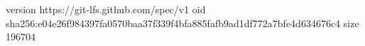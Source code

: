 version https://git-lfs.github.com/spec/v1
oid sha256:e04e26f984397fa0570baa37f339f4bfa885fafb9ad1df772a7bfe4d634676c4
size 196704
